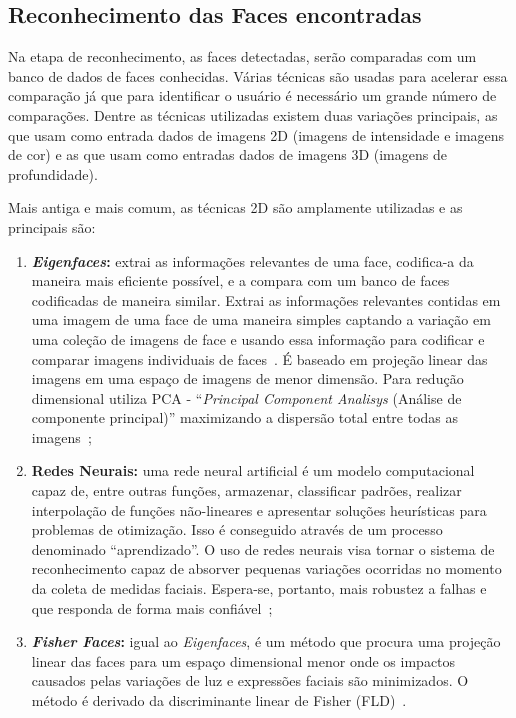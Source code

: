 \subsection{Reconhecimento das Faces encontradas}

Na etapa de reconhecimento, as faces detectadas, serão comparadas com um banco de dados de faces conhecidas. Várias técnicas são usadas para acelerar essa comparação já que para identificar o usuário é necessário um grande número de comparações. Dentre as técnicas utilizadas existem duas variações principais, as que usam como entrada dados de imagens 2D (imagens de intensidade e imagens de cor) e as que usam como entradas dados de imagens 3D (imagens de profundidade).

Mais antiga e mais comum, as técnicas 2D são amplamente utilizadas e as principais são:
	\begin{enumerate}
		\item \textbf{\textit{Eigenfaces}:} extrai as informações relevantes de uma face, codifica-a da maneira mais eficiente possível, e a compara com um banco de faces codificadas de maneira similar. Extrai as informações relevantes contidas em uma imagem de uma face de uma maneira simples captando a variação em uma coleção de imagens de face e usando essa informação para codificar e comparar imagens individuais de faces~\cite{turk}. É baseado em projeção linear das imagens em uma espaço de imagens de menor dimensão. Para redução dimensional utiliza PCA - ``\textit{Principal Component Analisys} (Análise de componente principal)'' maximizando a dispersão total entre todas as imagens~\cite{belhumeur};

		\item \textbf{Redes Neurais:} uma rede neural artificial é um modelo computacional capaz de, entre outras funções, armazenar, classificar padrões, realizar interpolação de funções não-lineares e apresentar soluções heurísticas para problemas de otimização. Isso é conseguido através de um processo denominado ``aprendizado''. O uso de redes neurais visa tornar o sistema de reconhecimento capaz de absorver pequenas variações ocorridas no momento da coleta de medidas faciais. Espera-se, portanto,  mais robustez a falhas e que responda de forma mais confiável~\cite{oliveira};

		\item \textbf{\textit{Fisher Faces}:} igual ao \textit{Eigenfaces}, é um método que procura uma projeção linear das faces para um espaço dimensional menor onde os impactos causados pelas variações de luz e expressões faciais são minimizados. O método é derivado da discriminante linear de Fisher (FLD)~\cite{belhumeur}.
	\end{enumerate}

